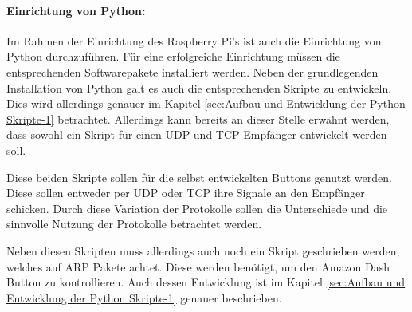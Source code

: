 \paragraph{Einrichtung von Python:}$\;$ \\
\label{sec:Python Skripte-1} 
Im Rahmen der Einrichtung des Raspberry Pi's ist auch die Einrichtung von Python durchzuführen. Für eine erfolgreiche Einrichtung müssen die entsprechenden Softwarepakete installiert werden.  Neben der grundlegenden Installation von Python galt es auch die entsprechenden Skripte zu entwickeln. Dies wird allerdings genauer im Kapitel \ref{sec:Aufbau und Entwicklung der Python Skripte-1} betrachtet. Allerdings kann bereits an dieser Stelle erwähnt werden, dass sowohl ein Skript für einen UDP und TCP Empfänger entwickelt werden soll. 

Diese beiden Skripte sollen für die selbst entwickelten Buttons genutzt werden. Diese sollen entweder per UDP oder TCP ihre Signale an den Empfänger schicken. Durch diese Variation der Protokolle sollen die Unterschiede und die sinnvolle Nutzung der Protokolle betrachtet werden. 

Neben diesen Skripten muss allerdings auch noch ein Skript geschrieben werden, welches auf ARP Pakete achtet. Diese werden benötigt, um den Amazon Dash Button zu kontrollieren. Auch dessen Entwicklung ist im Kapitel \ref{sec:Aufbau und Entwicklung der Python Skripte-1} genauer beschrieben. 
